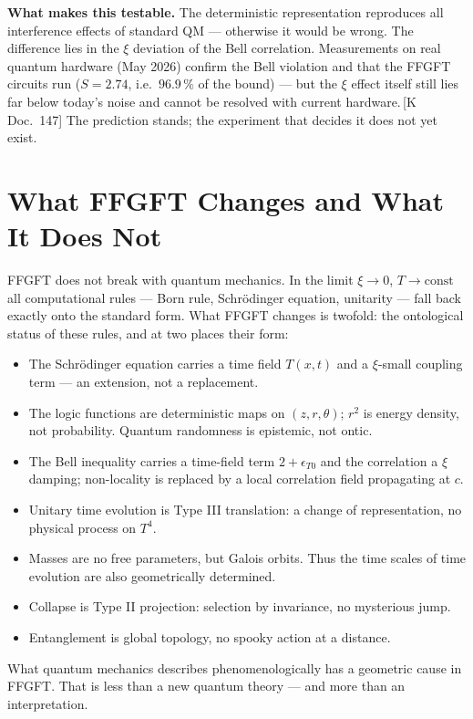 \documentclass[11pt,oneside]{book}
\newcommand{\status}[1]{\penalty10000\,{\scriptsize\textcolor{gray!60}{[#1]}}}
\begin{document}
\textbf{What makes this testable.} The deterministic representation
reproduces all interference effects of standard QM --- otherwise it would
be wrong. The difference lies in the $\xi$ deviation of the Bell correlation.
Measurements on real quantum hardware (May 2026) confirm the Bell
violation and that the FFGFT circuits run ($S = 2.74$, i.e.\ $96.9\,\%$ of
the bound) --- but the $\xi$ effect itself still lies far below today's
noise and cannot be resolved with current hardware.\status{K Doc.~147}
The prediction stands; the experiment that decides it does not yet exist.

\section*{What FFGFT Changes and What It Does Not}

FFGFT does not break with quantum mechanics. In the limit $\xi \to 0$,
$T \to \mathrm{const}$ all computational rules --- Born rule, Schrödinger
equation, unitarity --- fall back exactly onto the standard form. What
FFGFT changes is twofold: the ontological status of these rules, and at
two places their form:

\begin{itemize}
  \item The Schrödinger equation carries a time field $T(x,t)$ and a
    $\xi$-small coupling term --- an extension, not a replacement.
  \item The logic functions are deterministic maps on $(z,r,\theta)$;
    $r^2$ is energy density, not probability. Quantum randomness is
    epistemic, not ontic.
  \item The Bell inequality carries a time-field term $2+\epsilon_{T0}$
    and the correlation a $\xi$ damping; non-locality is replaced by a
    local correlation field propagating at $c$.
  \item Unitary time evolution is Type III translation: a change of
    representation, no physical process on $T^4$.
  \item Masses are no free parameters, but Galois orbits. Thus the time
    scales of time evolution are also geometrically determined.
  \item Collapse is Type II projection: selection by invariance, no mysterious
    jump.
  \item Entanglement is global topology, no spooky action at a distance.
\end{itemize}

What quantum mechanics describes phenomenologically has a geometric cause in
FFGFT. That is less than a new quantum theory — and more than an
interpretation.
\end{document}
